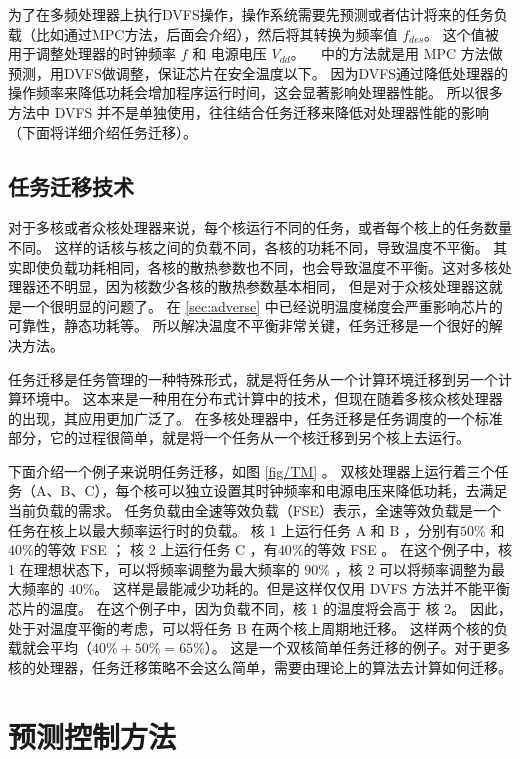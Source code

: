 为了在多频处理器上执行DVFS操作，操作系统需要先预测或者估计将来的任务负载（比如通过MPC方法，后面会介绍），然后将其转换为频率值 $f_{des}$。
这个值被用于调整处理器的时钟频率 $f$  和 电源电压 $V_{dd}$。 
~\cite{Zanini:ECCTD'09} 中的方法就是用 MPC 方法做预测，用DVFS做调整，保证芯片在安全温度以下。
因为DVFS通过降低处理器的操作频率来降低功耗会增加程序运行时间，这会显著影响处理器性能。
所以很多方法中 DVFS 并不是单独使用，往往结合任务迁移来降低对处理器性能的影响（下面将详细介绍任务迁移）。

\subsection{任务迁移技术}\label{sec:taskm}

对于多核或者众核处理器来说，每个核运行不同的任务，或者每个核上的任务数量不同。
这样的话核与核之间的负载不同，各核的功耗不同，导致温度不平衡。
其实即使负载功耗相同，各核的散热参数也不同，也会导致温度不平衡。这对多核处理器还不明显，因为核数少各核的散热参数基本相同，
但是对于众核处理器这就是一个很明显的问题了。 在 \ref{sec:adverse} 中已经说明温度梯度会严重影响芯片的可靠性，静态功耗等。
所以解决温度不平衡非常关键，任务迁移是一个很好的解决方法。

任务迁移是任务管理的一种特殊形式，就是将任务从一个计算环境迁移到另一个计算环境中。
这本来是一种用在分布式计算中的技术，但现在随着多核众核处理器的出现，其应用更加广泛了。
在多核处理器中，任务迁移是任务调度的一个标准部分，它的过程很简单，就是将一个任务从一个核迁移到另个核上去运行。

下面介绍一个例子来说明任务迁移，如图 \ref{fig/TM} 。
双核处理器上运行着三个任务（A、B、C），每个核可以独立设置其时钟频率和电源电压来降低功耗，去满足当前负载的需求。
任务负载由全速等效负载（FSE）表示，全速等效负载是一个任务在核上以最大频率运行时的负载。
核 1 上运行任务 A 和 B ，分别有$ 50\% $ 和 $ 40\%$的等效 FSE ；
核 2 上运行任务 C ，有$ 40\%$的等效 FSE 。
在这个例子中，核 1 在理想状态下，可以将频率调整为最大频率的 $90\%$ ，核 2 可以将频率调整为最大频率的 $40\%$。
这样是最能减少功耗的。但是这样仅仅用 DVFS 方法并不能平衡芯片的温度。
在这个例子中，因为负载不同，核 1 的温度将会高于 核 2。
因此，处于对温度平衡的考虑，可以将任务 B 在两个核上周期地迁移。
这样两个核的负载就会平均（$ 40\% + 50\% = 65\% $）。
这是一个双核简单任务迁移的例子。对于更多核的处理器，任务迁移策略不会这么简单，需要由理论上的算法去计算如何迁移。


\section{预测控制方法}\label{sec:pcm}

